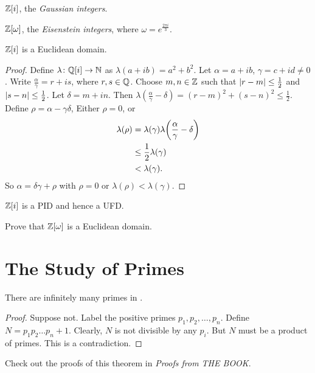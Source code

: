 \begin{examples}[UFD]
    \item $\mathbb{Z}[i]$, the \emph{Gaussian integers}.
    \item $\mathbb{Z}[\omega]$, the \emph{Eisenstein integers}, where
    $\omega = e^{\frac{2 \pi i}{3}}$.
\end{examples}
\begin{proposition}
    $\mathbb{Z}[i]$ is a Euclidean domain.
\end{proposition}
\begin{proof}
    Define $\lambda\colon \mathbb{Q}[i] \to \mathbb{N}$ as $\lambda(a + ib) = a^2 + b^2$.
    Let $\alpha = a + ib$, $\gamma = c + id \ne 0$.
    Write $\frac{\alpha}{\gamma} = r + is$, where $r, s \in \mathbb{Q}$.
    Choose $m, n \in \mathbb{Z}$ such that $\abs{r - m} \le \frac12$ and
    $\abs{s - n} \le \frac12$.
    Let $\delta = m + in$.
    Then $\lambda(\frac{\alpha}{\gamma} - \delta) = (r - m)^2 + (s - n)^2
    \le \frac12$.
    Define $\rho = \alpha - \gamma \delta$,
    Either $\rho = 0$, or \begin{align*}
        \lambda(\rho)
        &= \lambda(\gamma)
            \lambda\paren*[\bigg]{\frac{\alpha}{\gamma} - \delta} \\
        &\le \frac12 \lambda(\gamma) \\
        &< \lambda(\gamma).
    \end{align*}
    So $\alpha = \delta \gamma + \rho$ with $\rho = 0$ or
    $\lambda(\rho) < \lambda(\gamma)$.
\end{proof}
\begin{corollary}
    $\mathbb{Z}[i]$ is a PID and hence a UFD.
\end{corollary}

\begin{exercise}
    Prove that $\mathbb{Z}[\omega]$ is a Euclidean domain.
\end{exercise}

\chapter{The Study of Primes} \label{chp:primes}
\begin{theorem}[Euclid] \label{thm:infinitude_of_primes}
    There are infinitely many primes in \Z.
\end{theorem}
\begin{proof}
    Suppose not.
    Label the positive primes $p_1, p_2, \dots, p_n$.
    Define $N = p_1 p_2 \dots p_n + 1$.
    Clearly, $N$ is not divisible by any $p_i$.
    But $N$ must be a product of primes.
    This is a contradiction.
\end{proof}
\begin{remark}
    Check out the proofs of this theorem in \textit{Proofs from THE BOOK}.
\end{remark}

